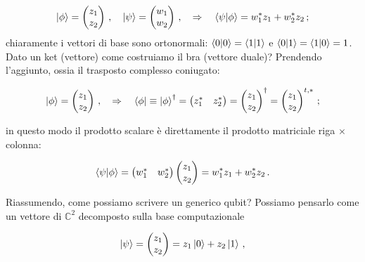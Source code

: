 \begin{equation*}
    \ket{\phi} = \begin{pmatrix} z_1 \\ z_2 \end{pmatrix} \, , \quad \ket{\psi} = \begin{pmatrix} w_1 \\ w_2 \end{pmatrix} \, , \quad \Rightarrow \quad \braket{\psi}{\phi} = w_1^\ast z_1 + w_2^\ast z_2 \, ;
\end{equation*}
\noindent chiaramente i vettori di base sono ortonormali: $\braket{0} = \braket{1}$ e $\braket{0}{1} = \braket{1}{0} = 1$. Dato un ket (vettore) come costruiamo il bra (vettore duale)? Prendendo l'aggiunto, ossia il trasposto complesso coniugato:

\begin{equation*}
    \ket{\phi} = \begin{pmatrix} z_1 \\ z_2 \end{pmatrix} \, , \quad \Rightarrow \quad \bra{\phi} \equiv \ket{\phi}^\dagger = \begin{pmatrix} z_1^\ast & z_2^\ast \end{pmatrix} = \begin{pmatrix} z_1 \\ z_2 \end{pmatrix}^\dagger = \begin{pmatrix} z_1 \\ z_2 \end{pmatrix}^{t, \ast} \, ;
\end{equation*}

\noindent in questo modo il prodotto scalare è direttamente il prodotto matriciale riga $\times$ colonna: 

\begin{equation*}
    \braket{\psi}{\phi} = \begin{pmatrix} w_1^\ast & w_2^\ast \end{pmatrix} \begin{pmatrix} z_1 \\ z_2 \end{pmatrix} = w_1^\ast z_1 + w_2^\ast z_2 \, .
\end{equation*}

\noindent Riassumendo, come possiamo scrivere un generico qubit? Possiamo pensarlo come un vettore di $\mathbb{C}^2$ decomposto sulla base computazionale

\begin{equation*}
    \ket{\psi} = \begin{pmatrix} z_1 \\ z_2 \end{pmatrix} = z_1 \ket{0} + z_2 \ket{1} \, ,
\end{equation*}

